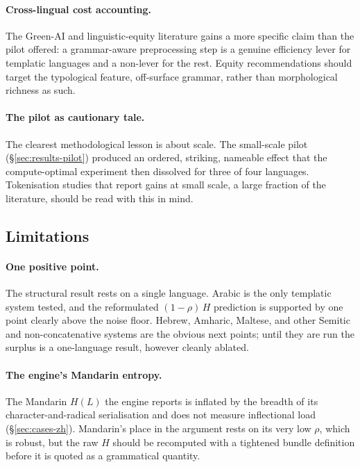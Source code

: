\paragraph{Cross-lingual cost accounting.} The Green-AI and linguistic-equity literature \citep{schwartz2020, bender2021, ahia2023} gains a more specific claim than the pilot offered: a grammar-aware preprocessing step is a genuine efficiency lever for templatic languages and a non-lever for the rest. Equity recommendations should target the typological feature, off-surface grammar, rather than morphological richness as such.

\paragraph{The pilot as cautionary tale.} The clearest methodological lesson is about scale. The small-scale pilot (\S\ref{sec:results-pilot}) produced an ordered, striking, nameable effect that the compute-optimal experiment then dissolved for three of four languages. Tokenisation studies that report gains at small scale, a large fraction of the literature, should be read with this in mind.

\subsection{Limitations}
\label{sec:discussion-limitations}

\paragraph{One positive point.} The structural result rests on a single language. Arabic is the only templatic system tested, and the reformulated $(1-\rho)\,H$ prediction is supported by one point clearly above the noise floor. Hebrew, Amharic, Maltese, and other Semitic and non-concatenative systems are the obvious next points; until they are run the surplus is a one-language result, however cleanly ablated.

\paragraph{The engine's Mandarin entropy.} The Mandarin $H(L)$ the engine reports is inflated by the breadth of its character-and-radical serialisation and does not measure inflectional load (\S\ref{sec:cases-zh}). Mandarin's place in the argument rests on its very low $\rho$, which is robust, but the raw $H$ should be recomputed with a tightened bundle definition before it is quoted as a grammatical quantity.

